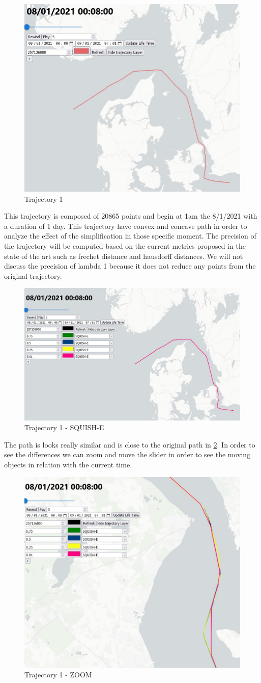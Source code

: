 \begin{figure}[!h]
\centering
\includegraphics[width=0.5\linewidth]{figures/Stats/traj_1.jpg}
\caption{Trajectory 1}
\label{fig:traj_1}
\end{figure}

This trajectory is composed of 20865 points and begin at 1am the 8/1/2021 with a duration of 1 day. This trajectory have convex and concave path in order to analyze the effect of the simplification in those specific moment. The precision of the trajectory will be computed based on the current metrics proposed in the state of the art such as frechet distance and hausdorff distances. We will not discuss the precision of lambda 1 because it does not reduce any points from the original trajectory.



\begin{figure}[!h]
\centering
\includegraphics[width=0.5\linewidth]{figures/Stats/squish_1.jpg}
\caption{Trajectory 1 - SQUISH-E}
\label{fig:traj_1_squish}
\end{figure}

The path is looks really similar and is close to the original path in \ref{fig:traj_1_squish}. In order to see the differences we can zoom and move the slider in order to see the moving objects in relation with the current time.

\begin{figure}[!h]
\centering
\includegraphics[width=0.5\linewidth]{figures/Stats/squish_1_zoom.jpg}
\caption{Trajectory 1 - ZOOM }
\label{fig:traj_1_sqzoom}
\end{figure}

